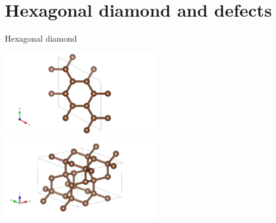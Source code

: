 \documentclass[handout]{beamer}
\begin{document}


\section{Hexagonal diamond and defects} %


\begin{frame}{Hexagonal diamond}
  \begin{center}
    \includegraphics[width=0.5\textwidth, trim=0 0 30em 0,clip]{images/poscar_hex_16_hex-view.png}\\
    \includegraphics[width=0.5\textwidth, trim=0 0 27em 0,clip]{images/poscar_hex_16_birdseye.png}
  \end{center}
\end{frame}
\end{document}
